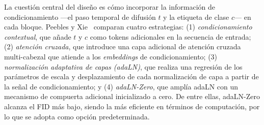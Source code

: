 \documentclass[../../book-main_es.tex]{subfiles}
\begin{document}
La cuestión central del diseño es cómo incorporar la información de condicionamiento ---el paso 
temporal de difusión $t$ y la etiqueta de clase $c$--- en cada bloque. Peebles y Xie~\citep{peebles2023scalable} 
comparan cuatro estrategias: (1) \emph{condicionamiento contextual}, que añade $t$ y $c$ como tokens 
adicionales en la secuencia de entrada; (2) \emph{atención cruzada}, que introduce una capa adicional 
de atención cruzada multi-cabezal que atiende a los \textit{embeddings} de condicionamiento; (3) 
\emph{normalización adaptativa de capas (adaLN)}, que realiza una regresión de los parámetros de escala 
y desplazamiento de cada normalización de capa a partir de la señal de condicionamiento; y (4) 
\emph{adaLN-Zero}, que amplía adaLN con un mecanismo de compuerta adicional inicializado a cero. 
De entre ellas, adaLN-Zero alcanza el FID más bajo, siendo la más eficiente en términos de computación, 
por lo que se adopta como opción predeterminada.
\end{document}
